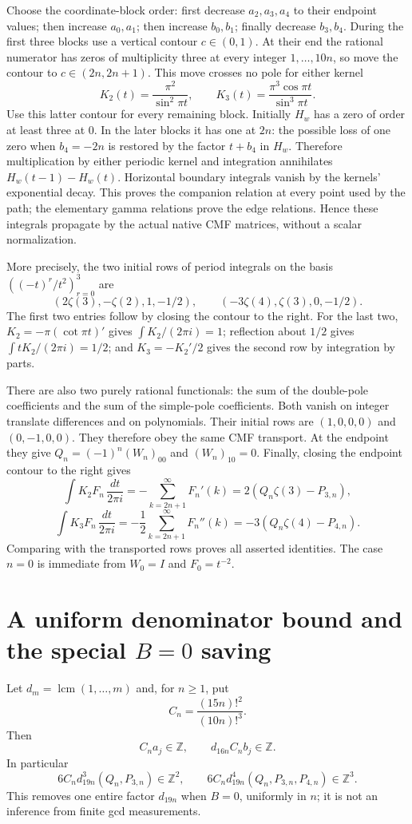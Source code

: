 Choose the coordinate-block order: first decrease $a_2,a_3,a_4$ to their
endpoint values; then increase $a_0,a_1$; then increase $b_0,b_1$; finally
decrease $b_3,b_4$.  During the first three blocks use a vertical contour
$c\in(0,1)$.  At their end the rational numerator has zeros of multiplicity
three at every integer $1,\ldots,10n$, so move the contour to
$c\in(2n,2n+1)$.  This move crosses no pole for either kernel
\[
 K_2(t)=\frac{\pi^2}{\sin^2\pi t},\qquad
 K_3(t)=\frac{\pi^3\cos\pi t}{\sin^3\pi t}.
\]
Use this latter contour for every remaining block.  Initially $H_w$ has
a zero of order at least three at $0$.  In the later blocks it has one at
$2n$: the possible loss of one zero when $b_4=-2n$ is restored by the
factor $t+b_4$ in $H_w$.  Therefore multiplication by either periodic
kernel and integration annihilates $H_w(t-1)-H_w(t)$.  Horizontal boundary
integrals vanish by the kernels' exponential decay.  This proves the
companion relation at every point used by the path; the elementary gamma
relations prove the edge relations.  Hence these integrals propagate by
the actual native CMF matrices, without a scalar normalization.

More precisely, the two initial rows of period integrals on the basis
$((-t)^r/t^2)_{r=0}^3$ are
\[
 (2\zeta(3),-\zeta(2),1,-1/2),\qquad
 (-3\zeta(4),\zeta(3),0,-1/2).
\]
The first two entries follow by closing the contour to the right.
For the last two, $K_2=-\pi(\cot\pi t)'$ gives
$\int K_2/(2\pi i)=1$; reflection about $1/2$ gives
$\int tK_2/(2\pi i)=1/2$; and $K_3=-K_2'/2$ gives the second row by
integration by parts.

There are also two purely rational functionals: the sum of the double-pole
coefficients and the sum of the simple-pole coefficients.  Both vanish on
integer translate differences and on polynomials.  Their initial rows are
$(1,0,0,0)$ and $(0,-1,0,0)$.  They therefore obey the same CMF transport.
At the endpoint they give $Q_n=(-1)^n(W_n)_{00}$ and $(W_n)_{10}=0$.
Finally, closing the endpoint contour to the right gives
\[
 \int K_2F_n\,\frac{dt}{2\pi i}
   =-\sum_{k=2n+1}^{\infty}F_n'(k)=2(Q_n\zeta(3)-P_{3,n}),
\]
\[
 \int K_3F_n\,\frac{dt}{2\pi i}
   =-\frac12\sum_{k=2n+1}^{\infty}F_n''(k)
   =-3(Q_n\zeta(4)-P_{4,n}).
\]
Comparing with the transported rows proves all asserted identities.
The case $n=0$ is immediate from $W_0=I$ and $F_0=t^{-2}$.

\section{A uniform denominator bound and the special $B=0$ saving}
Let $d_m=\operatorname{lcm}(1,\ldots,m)$ and, for $n\ge1$, put
\[
 C_n=\frac{(15n)!^2}{(10n)!^3}.
\]
Then
\[
 C_na_j\in\mathbb Z,\qquad d_{16n}C_nb_j\in\mathbb Z.
\]
In particular
\[
 6C_nd_{19n}^3(Q_n,P_{3,n})\in\mathbb Z^2,\qquad
 6C_nd_{19n}^4(Q_n,P_{3,n},P_{4,n})\in\mathbb Z^3.
\]
This removes one entire factor $d_{19n}$ when $B=0$, uniformly in $n$;
it is not an inference from finite gcd measurements.

